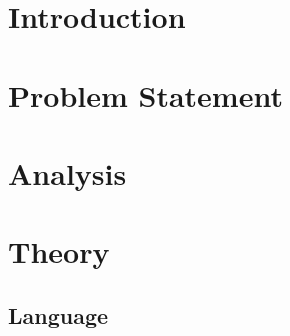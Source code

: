


\frontmatter %
\newcommand{\ind}[1]{}

\ind{FormaliaForside}
\cleardoublepage %

\ind{FormaliaTitelblad}
\cleardoublepage
\ind{FormaliaProlog.tex}
\ind{FormaliaUnderskriftsside.tex}
\cleardoublepage



\setlength\parskip{0ex} %
\tableofcontents* %
\setlength{\parskip}{3mm} %



\label{marker}
\mainmatter

\pagestyle{custom}

\chapter{Introduction}
\ind{FormaliaIndledning}

\renewcommand{\ind}[1]{}
\chapter{Problem Statement}
\chapter{Analysis}
	\ind{ourEnvironment}
	\ind{Hardware}
	\ind{problemstatement}

\renewcommand{\ind}[1]{}
\chapter{Theory}
	\section{Language}
	\ind{sprogParadigmer}

